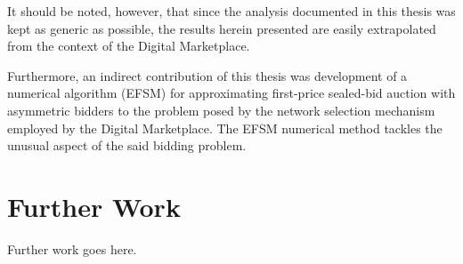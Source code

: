 It should be noted, however, that since the analysis documented in this thesis was kept as generic as possible, the results herein presented are easily extrapolated from the context of the Digital Marketplace.

Furthermore, an indirect contribution of this thesis was development of a numerical algorithm (EFSM) for approximating first-price sealed-bid auction with asymmetric bidders to the problem posed by the network selection mechanism employed by the Digital Marketplace. The EFSM numerical method tackles the unusual aspect of the said bidding problem.

\section{Further Work} %
\label{sec:further_work_conclusions}
Further work goes here.
